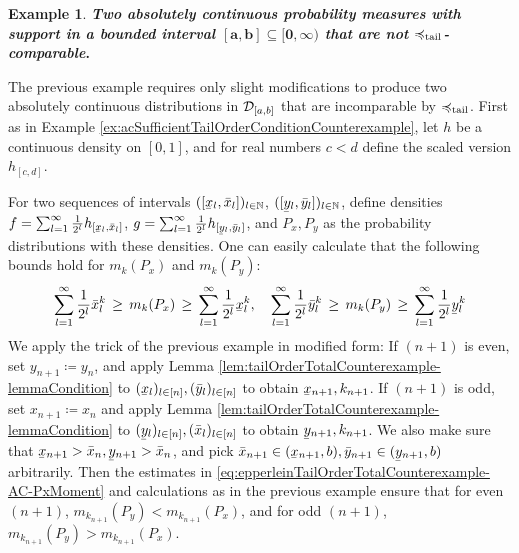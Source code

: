 \documentclass[a4paper,DIV=11]{scrreprt}
\theoremstyle{definition}
\newtheorem{ex}[thm]{Example} %
\begin{document}
    \begin{ex}\textbf{\textsl{Two absolutely continuous probability measures with support in a bounded interval $\mathbf{\boldsymbol{[a, b] \subseteq [0, \infty)}}$ that are not $\preccurlyeq_{\text{tail}}$-comparable}.}
        
        The previous example requires only slight modifications to produce two absolutely continuous distributions in $\mathcal{D}_{[a, b]}$ that are incomparable by $\preccurlyeq_{\text{tail}}$.
        First as in Example \ref{ex:acSufficientTailOrderConditionCounterexample}, let $h$ be a continuous density on $[0, 1]$, and for real numbers $c < d$ define the scaled version $h_{[c, d]}$.
        
        For two sequences of intervals $([\ubar{x}_l, \bar{x}_l])_{l \in \N}$, $([\ubar{y}_l, \bar{y}_l])_{l \in \N}$, define densities
        $f = \sum_{l=1}^{\infty}\frac{1}{2^l} h_{[\ubar{x}_l, \bar{x}_l]}$, $g = \sum_{l=1}^{\infty}\frac{1}{2^l} h_{[\ubar{y}_l, \bar{y}_l]}$, and $P_x, P_y$ as the probability distributions with these densities.
        One can easily calculate that the following bounds hold for $m_k(P_x)$ and $m_k(P_y)$:
        \begin{gather}
            \sum_{l =1}^\infty \frac{1}{2^l} \bar{x}_l^k \,\geq\, m_k(P_x) \,\geq\, \sum_{l =1}^\infty \frac{1}{2^l} \ubar{x}_l^k,\quad
            \sum_{l =1}^\infty \frac{1}{2^l} \bar{y}_l^k \,\geq\, m_k(P_y) \,\geq\, \sum_{l =1}^\infty \frac{1}{2^l} \ubar{y}_l^k
            \label{eq:epperleinTailOrderTotalCounterexample-AC-PxMoment}
        \end{gather}
        We apply the trick of the previous example in modified form:
        If $(n+1)$ is even, set $y_{n+1} \coloneqq y_n$, and apply Lemma \ref{lem:tailOrderTotalCounterexample-lemmaCondition} to $(\ubar{x}_l)_{l \in [n]}, (\bar{y}_l)_{l \in [n]}$ to obtain $\ubar{x}_{n+1}, k_{n+1}$. If $(n+1)$ is odd, set $x_{n+1} \coloneqq x_n$ and apply Lemma \ref{lem:tailOrderTotalCounterexample-lemmaCondition} to $(\ubar{y}_l)_{l \in [n]}, (\bar{x}_l)_{l \in [n]}$ to obtain $\ubar{y}_{n+1}, k_{n+1}$. We also make sure that $\ubar{x}_{n+1} > \bar{x}_{n}, \ubar{y}_{n+1} > \bar{x}_n$, and pick $\bar{x}_{n+1} \in (\ubar{x}_{n+1}, b), \bar{y}_{n+1} \in (\ubar{y}_{n+1}, b)$ arbitrarily.
        Then the estimates in \eqref{eq:epperleinTailOrderTotalCounterexample-AC-PxMoment} and calculations as in the previous example ensure that for even $(n+1)$,  $m_{k_{n+1}}(P_y) < m_{k_{n+1}}(P_x)$, and for odd $(n+1)$, $m_{k_{n+1}}(P_y) > m_{k_{n+1}}(P_x)$.
        

\end{ex}
\end{document}
